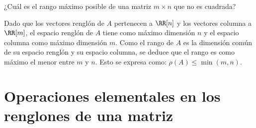\begin{examplebox}{}{}
    ¿Cuál es el rango máximo posible de una matriz $m \times n$ que no es cuadrada?

    \tcblower
    \solucion Dado que los vectores renglón de $A$ pertenecen a $\RR[n]$ y los vectores columna a $\RR[m]$, el espacio renglón de $A$ tiene como máximo dimensión $n$ y el espacio columna como máximo dimensión $m$. Como el rango de $A$ es la dimensión común de su espacio renglón y su espacio columna, se deduce que el rango es como máximo el menor entre $m$ y $n$. Esto se expresa como: $\rho(A) \leq \min(m, n)$.
\end{examplebox}

\newpage

\section{Operaciones elementales en los renglones de una matriz}

